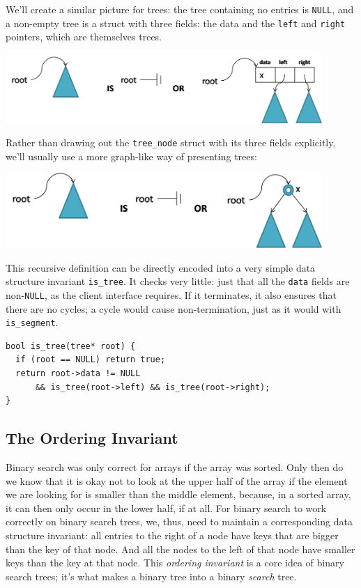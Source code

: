 We'll create a similar picture for trees: the tree containing no
entries is \lstinline'NULL', and a non-empty tree is a struct with three
fields: the data and the \lstinline'left' and \lstinline'right' pointers, which
are themselves trees.
\begin{center}
  \includegraphics[width=0.9\textwidth]{img/bst-cases.png}
\end{center}
Rather than drawing out the \lstinline'tree_node' struct with its three
fields explicitly, we'll usually use a more graph-like way of
presenting trees:
\begin{center}
  \includegraphics[width=0.9\textwidth]{img/bst-cases2.png}
\end{center}

This recursive definition can be directly encoded into a very simple
data structure invariant \lstinline'is_tree'. It checks very little: just
that all the \lstinline'data' fields are non-\lstinline'NULL', as the client
interface requires. If it terminates, it also ensures that there are no cycles;
a cycle would cause non-termination, just as it would with
\lstinline'is_segment'.
\begin{lstlisting}[language={[C0]C}]
bool is_tree(tree* root) {
  if (root == NULL) return true;
  return root->data != NULL
      && is_tree(root->left) && is_tree(root->right);
}
\end{lstlisting}


\subsection{The Ordering Invariant}

Binary search was only correct for arrays if the array was sorted.
Only then do we know that it is okay not to look at the upper half of
the array if the element we are looking for is smaller than the middle
element, because, in a sorted array, it can then only occur in the
lower half, if at all.  For binary search to work correctly on binary
search trees, we, thus, need to maintain a corresponding data
structure invariant: all entries to the right of a node have keys
that are bigger than the key of that node.  And all the nodes to the
left of that node have smaller keys than the key at that node.  This
\emph{ordering invariant} is a core idea of binary search trees; it's
what makes a binary tree into a binary \emph{search} tree.

